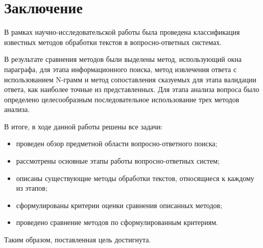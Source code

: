 \chapter*{Заключение}

В рамках научно-исследовательской работы была проведена классификация известных методов обработки текстов в вопросно-ответных системах.

В результате сравнения методов были выделены метод, использующий окна параграфа, для этапа информационного поиска, метод извлечения ответа с использованием N-грамм и метод сопоставления сказуемых для этапа валидации ответа, как наиболее точные из представленных. Для этапа анализа вопроса было определено целесообразным последовательное использование трех методов анализа.

В итоге, в ходе данной работы решены все задачи:
\begin{itemize}
	\item проведен обзор предметной области вопросно-ответного поиска;
	\item рассмотрены основные этапы работы вопросно-ответных систем;
	\item описаны существующие методы обработки текстов, относящиеся к каждому из этапов;
	\item сформулированы критерии оценки сравнения описанных методов;
	\item проведено сравнение методов по сформулированным критериям.
\end{itemize}

Таким образом, поставленная цель достигнута.



